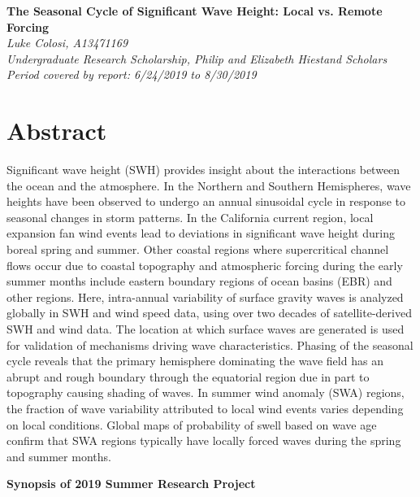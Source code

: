 \documentclass[12pt,twoside]{article}
\begin{document}
\begin{center}
{\bf\huge{The Seasonal Cycle of Significant Wave Height: Local vs. Remote Forcing}}\\ \vspace{1.5cm}
\textit{\large{Luke Colosi, A13471169}}\\
\textit{\large{Undergraduate Research Scholarship, Philip and Elizabeth Hiestand Scholars}} \\
\textit{\large{Period covered by report: 6/24/2019 to 8/30/2019}}
\end{center}
\vspace{.5cm}

\section*{Abstract}

Significant wave height (SWH) provides insight about the interactions between the ocean and the atmosphere. In the Northern and Southern Hemispheres, wave heights have been observed to undergo an annual sinusoidal cycle in response to seasonal changes in storm patterns. In the California current region, local expansion fan wind events lead to deviations in significant wave height during boreal spring and summer. Other coastal regions where supercritical channel flows occur due to coastal topography and atmospheric forcing during the early summer months include eastern boundary regions of ocean basins (EBR) and other regions. Here, intra-annual variability of surface gravity waves is analyzed globally in SWH and wind speed data, using over two decades of satellite-derived SWH and wind data. The location at which surface waves are generated is used for validation of mechanisms driving wave characteristics. Phasing of the seasonal cycle reveals that the primary hemisphere dominating the wave field has an abrupt and rough boundary through the equatorial region due in part to topography causing shading of waves. In summer wind anomaly (SWA) regions, the fraction of wave variability attributed to local wind events varies depending on local conditions. Global maps of probability of swell based on wave age confirm that SWA regions typically have locally forced waves during the spring and summer months.

\begin{center}
{\bf\large{Synopsis of 2019 Summer Research Project}}\\
\end{center}
\end{document}

